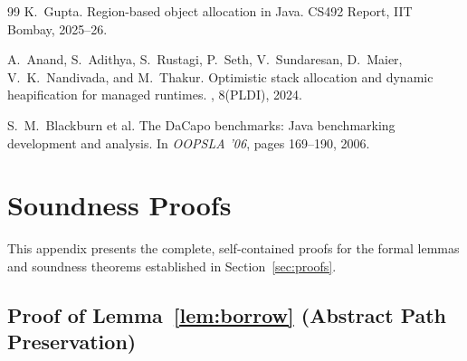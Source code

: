 \documentclass[12pt,a4paper]{article}
\begin{document}
\begin{thebibliography}{99}
K.~Gupta.
\newblock Region-based object allocation in {Java}.
\newblock CS492 Report, IIT Bombay, 2025--26.

A.~Anand, S.~Adithya, S.~Rustagi, P.~Seth, V.~Sundaresan, D.~Maier, V.~K.~Nandivada, and M.~Thakur.
\newblock Optimistic stack allocation and dynamic heapification for managed runtimes.
, 8(PLDI), 2024.

S.~M.~Blackburn et al.
\newblock The {DaCapo} benchmarks: {Java} benchmarking development and analysis.
\newblock In {\em OOPSLA '06}, pages 169--190, 2006.

\end{thebibliography}

\appendix
\section{Soundness Proofs}
\label{sec:appendix-proofs}

This appendix presents the complete, self-contained proofs for the formal lemmas and soundness theorems established in Section~\ref{sec:proofs}.

\subsection{Proof of Lemma~\ref{lem:borrow} (Abstract Path Preservation)}
\label{sec:proof-lem-borrow}
\end{document}
